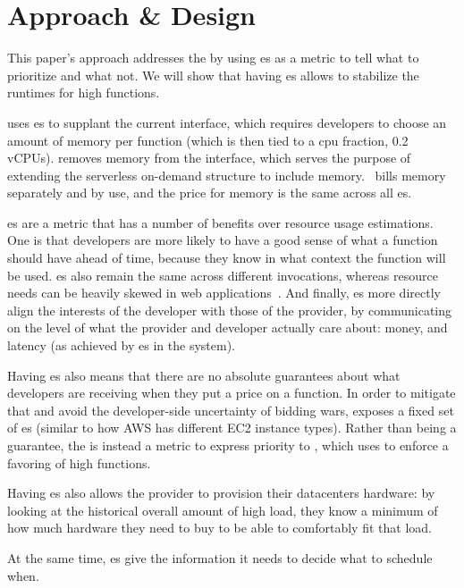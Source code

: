 \section{Approach \& Design}\label{design}

This paper's approach addresses the \problem{} by using \priceclass{}es as a
metric to tell \sys{} what to prioritize and what not. We will show that having
\priceclass{}es allows \sys{} to stabilize the runtimes for high \class{}
functions. 

\Sys{} uses \class{}es to supplant the current interface, which requires
developers to choose an amount of memory per function (which is then tied to a
cpu fraction, \eg{} 0.2 vCPUs). \Sys{} removes memory from the interface, which
serves the purpose of extending the serverless on-demand structure to include
memory.~\Sys{} bills memory separately and by use, and the price for memory is
the same across all \class{}es. 

\Priceclass{}es are a metric that has a number of benefits over resource usage
estimations. One is that developers are more likely to have a good sense of what
\priceclass{} a function should have ahead of time, because they know in what
context the function will be used. \Priceclass{}es also remain the same across
different invocations, whereas resource needs can be heavily skewed in web
applications~\cite{hermod,serverless-in-the-wild}. And finally, \class{}es more
directly align the interests of the developer with those of the provider, by
communicating on the level of what the provider and developer actually care
about: money, and latency (as achieved by \class{}es in the system).

Having \priceclass{}es also means that there are no absolute guarantees about
what developers are receiving when they put a price on a function. In order to
mitigate that and avoid the developer-side uncertainty of bidding wars, \sys{}
exposes a fixed set of \priceclass{}es (similar to how AWS has different EC2
instance types). Rather than being a guarantee, the \priceclass{} is instead a
metric to express priority to \sys{}, which \sys{} uses to enforce a favoring of
high \class{} functions.

Having \priceclass{}es also allows the provider to provision their datacenters
hardware: by looking at the historical overall amount of high \priceclass{}
load, they know a minimum of how much hardware they need to buy to be able to
comfortably fit that load.

At the same time, \class{}es give \sys{} the information it needs to decide what
to schedule when.



